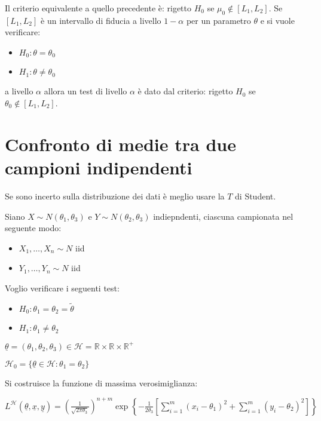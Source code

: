\documentclass[hidelinks, 10pt]{report}
\begin{document}
Il criterio equivalente a quello precedente \`e: rigetto $ H_{0} $ se $ \mu_{0} \not\in [L_{1}, L_{2}] $. Se $ [L_{1}, L_{2}] $ \`e un intervallo di fiducia a livello $ 1 - \alpha $ per un parametro $ \theta $ e si vuole verificare:
\begin{itemize}
\item $ H_{0}: \theta = \theta_{0} $
\item $ H_{1}: \theta \ne \theta_{0} $
\end{itemize} 

a livello $ \alpha $ allora un test di livello $ \alpha $ \`e dato dal criterio: rigetto $ H_{0} $ se $ \theta_{0} \not\in [L_{1}, L_{2}] $.

\section{Confronto di medie tra due campioni indipendenti}
Se sono incerto sulla distribuzione dei dati \`e meglio usare la $ T $ di Student.

Siano $ X \sim N(\theta_{1}, \theta_{3}) $ e $ Y \sim N(\theta_{2}, \theta_{3}) $ indiepndenti, ciascuna campionata nel seguente modo:

\begin{itemize}
\item $ X_{1}, \dotsc, X_{n} \sim N $ iid
\item $ Y_{1}, \dotsc, Y_{n} \sim N $ iid
\end{itemize}

Voglio verificare i seguenti test:

\begin{itemize}
\item $ H_{0} : \theta_{1} = \theta_{2} = \tilde{\theta} $
\item $ H_{1} : \theta_{1} \ne \theta_{2} $
\end{itemize}

$ \underline{\theta} = (\theta_{1}, \theta_{2}, \theta_{3}) \in \mathcal{H} = \mathbb{R} \times \mathbb{R} \times \mathbb{R}^{+} $

$ \mathcal{H}_{0} = \{ \underline{\theta} \in \mathcal{H} : \theta_{1} = \theta_{2} \} $

Si costruisce la funzione di massima verosimiglianza:

$ L^{\mathcal{H}} (\underline{\theta}, \underline{x}, \underline{y}) = \left( \frac{1}{\sqrt{2 \pi \theta_{3}}} \right)^{n + m} \exp \left\{ - \frac{1}{2 \theta_{3}} \left[ \sum\limits_{i = 1}^{m} (x_{i} - \theta_{1})^{2} + \sum\limits_{i = 1}^{m} (y_{i} - \theta_{2})^{2} \right] \right\} $
\end{document}
